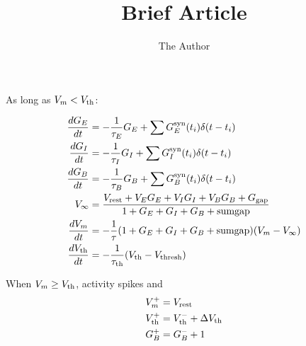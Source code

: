 \documentclass[12pt]{amsart}
\title{Brief Article}
\author{The Author}
\begin{document}

\noindent As long as $V_m < V_{\scriptstyle{\rm th}}$:

\begin{align*}
\frac{dG_E}{dt} &= -\dfrac{1}{\tau_E} G_E + \sum G_E^{\scriptstyle{\rm syn}}(t_i)\delta(t-t_i)\\
\frac{dG_I}{dt} &= -\dfrac{1}{\tau_I} G_I + \sum G_I^{\scriptstyle{\rm syn}}(t_i)\delta(t-t_i)\\
\frac{dG_B}{dt} &= -\dfrac{1}{\tau_B} G_B + \sum G_B^{\scriptstyle{\rm syn}}(t_i)\delta(t-t_i)\\
V_\infty &= \dfrac{V_{\scriptstyle{\rm rest}} + V_E G_E + V_I G_I + V_B G_B + G_{\scriptstyle{\rm gap}}}{1+G_E+G_I+G_B+\text{sumgap}}\\
\frac{dV_m}{dt} &= -\dfrac{1}{\tau}(1+G_E+G_I+G_B+\text{sumgap})(V_m-V_\infty)\\
\frac{dV_{\scriptstyle{\rm th}}}{dt} &= -\dfrac{1}{\tau_{\scriptstyle{\rm th}}}(V_{\scriptstyle{\rm th}}-V_{\scriptstyle{\rm thresh}})
\\
\end{align*}

\noindent When $V_m\ge V_{\scriptstyle{\rm th}}$, activity spikes and
\begin{align*}
V_m^+ &= V_{\scriptstyle{\rm rest}}\\
V_{\scriptstyle{\rm th}}^+ &= V_{\scriptstyle{\rm th}}^- + \Delta V_{\scriptstyle{\rm th}}\\
G_B^+ &= G_B^- + 1
\end{align*}
\end{document}
